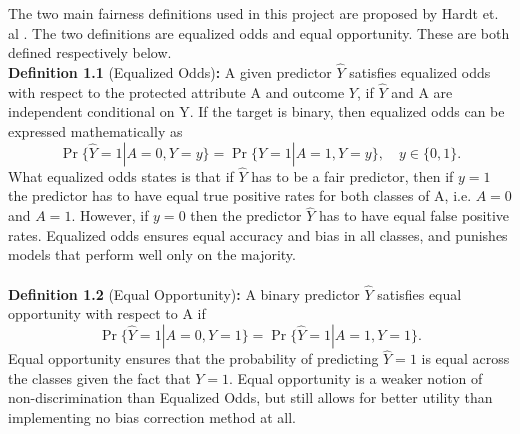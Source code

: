 \documentclass[11pt, fleqn, titlepage]{article}
\begin{document}
	The two main fairness definitions used in this project are proposed by Hardt et. al \cite{equal_of_oppor}. The two definitions are equalized odds and equal opportunity. These are both defined respectively below.  \\ \newline \textbf{Definition 1.1} (Equalized Odds)\textbf{:} A given predictor $ \hat Y $ satisfies equalized odds with respect to the protected attribute A and outcome $ Y $, if $ \hat Y $ and A are independent conditional on Y. If the target is binary, then equalized odds can be expressed mathematically as
	\begin{equation*}\label{key}
	\operatorname{Pr}\{\widehat{Y}=1 | A=0, Y=y\}=\operatorname{Pr}\{\hat{Y}=1 | A=1, Y=y\}, \quad y \in\{0,1\}.
	\end{equation*}
	What equalized odds states is that if $ \hat Y $ has to be a fair predictor, then if $ y = 1 $ the predictor has to have equal true positive rates for both classes of A, i.e. $ A = 0 $  and $ A = 1 $. However, if $ y = 0 $ then the predictor $ \hat Y $ has to have equal false positive rates. Equalized odds ensures equal accuracy and bias in all classes, and punishes models that perform well only on the majority.
	\\\\
	\textbf{Definition 1.2} (Equal Opportunity)\textbf{:} A binary predictor $ \hat Y $ satisfies equal opportunity with respect to A if 
	\begin{equation*}
		\operatorname{Pr}\{\hat{Y}=1 | A=0, Y=1\}=\operatorname{Pr}\{\hat{Y}=1 | A=1, Y=1\}.
	\end{equation*}
	Equal opportunity ensures that the probability of predicting $ \hat Y = 1 $ is equal across the classes given the fact that $ Y = 1 $. Equal opportunity is a weaker notion of non-discrimination than Equalized Odds, but still allows for better utility than implementing no bias correction method at all.
	
	
\end{document}
